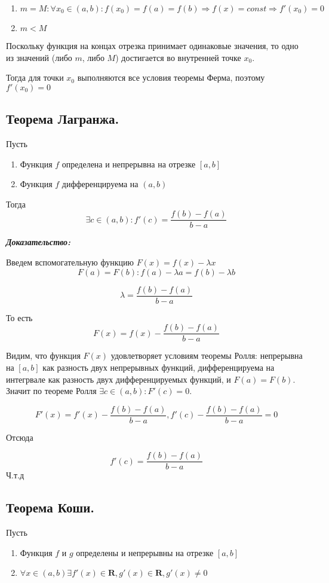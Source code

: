 \documentclass[a4paper,12pt]{article}
\theoremstyle{plain} %
\theoremstyle{definition} %
\theoremstyle{remark} %
\begin{document}
\begin{enumerate}
	\item $m = M: \forall x_0 \in (a, b): f(x_0) = f(a) = f(b) \Rightarrow f(x) = const \Rightarrow f'(x_0) = 0$
	\item $m < M$
\end{enumerate}

Поскольку функция на концах отрезка принимает одинаковые значения, то одно из значений (либо $m$, либо $M$) достигается во внутренней точке $x_0$.

Тогда для точки $x_0$ выполняются все условия теоремы Ферма, поэтому $f'(x_0) = 0$




\newpage
{}
\subsection*{Теорема Лагранжа.                                                                          }

Пусть
\begin{enumerate}
	\item Функция $f$ определена и непрерывна на отрезке $[a, b]$
	\item Функция $f$ дифференцируема на $(a, b)$
\end{enumerate}
Тогда
\[
	\exists c \in (a, b): f'(c) = \frac{f(b) - f(a)}{b - a}
\]

\textit{\textbf{Доказательство:}}

Введем вспомогательную функцию $F(x) = f(x) - \lambda x$
\[
	F(a) = F(b): f(a) - \lambda a = f(b) - \lambda b
\]

\[
	\lambda = \frac{f(b) - f(a)}{b - a}
\]

То есть \[F(x) = f(x) - \frac{f(b) - f(a)}{b - a}\]

Видим, что функция $F(x)$ удовлетворяет условиям теоремы Ролля: непрерывна на $[a, b]$ как разность двух непрерывных функций, дифференцируема на интегрвале как разность двух дифференцируемых функций, и $F(a) = F(b)$. Значит по теореме Ролля $\exists c \in (a, b): F'(c) = 0$.

\[ F'(x) = f'(x) - \frac{f(b) - f(a)}{b - a}, f'(c) - \frac{f(b) - f(a)}{b - a} = 0\]

Отсюда

\[ f'(c) = \frac{f(b) - f(a)}{b - a} \]
Ч.т.д



\newpage
{}
\subsection*{Теорема Коши.                                                                              }
Пусть
\begin{enumerate}
	\item Функция $f$ и $g$ определены и непрерывны на отрезке $[a, b]$
	\item $\forall x \in (a, b) \exists f'(x) \in \mathbf{R}, g'(x) \in \mathbf{R}, g'(x) \neq 0 $
\end{enumerate}
\end{document}
